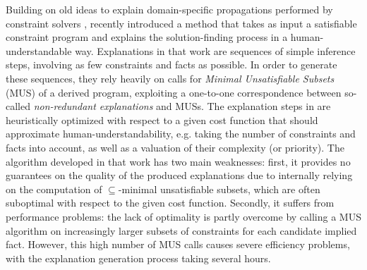 


Building on old ideas to explain domain-specific propagations performed by constraint solvers  \cite{sqalli1996inference,freuder2001explanation}, \citet{ecai/BogaertsGCG20} recently introduced a 
method that takes as input a satisfiable constraint program and explains the solution-finding process in a human-understandable way. 
Explanations in that work are sequences of simple inference steps, involving as few constraints and facts as possible. 
In order to generate these sequences, they rely heavily on calls for  \emph{Minimal Unsatisfiable Subsets} (MUS) \cite{marques2010minimal} of a derived program, exploiting a one-to-one correspondence between so-called \emph{non-redundant explanations} and MUSs.
The explanation steps in \citet{ecai/BogaertsGCG20} are heuristically optimized with respect to a given cost function that should approximate human-understandability, e.g. taking the number of constraints and facts into account, as well as a valuation of their complexity (or priority). 
The algorithm developed in that work has two main weaknesses: first, it provides no guarantees on the quality of the produced explanations due to internally relying on the computation of $\subseteq$-minimal unsatisfiable subsets, which are often suboptimal with respect to the given cost function. 
Secondly, it suffers from performance problems: the lack of optimality is partly overcome by calling a MUS algorithm on increasingly larger subsets of constraints for each candidate implied fact. %
However, this high number of MUS calls causes severe efficiency problems, with the explanation generation process taking several hours.


